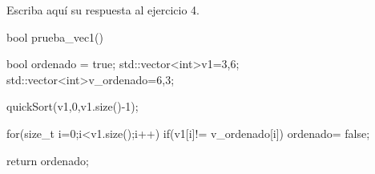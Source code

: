 Escriba aquí su respuesta al ejercicio 4.

\begin{lslisting}
bool prueba_vec1(){
    
bool ordenado = true; 
std::vector<int>v1={3,6};
std::vector<int>v_ordenado={6,3};
    
quickSort(v1,0,v1.size()-1);
    
for(size_t i=0;i<v1.size();i++){
    if(v1[i]!= v_ordenado[i]){
        ordenado= false;
    }
}
    
return ordenado;

}
\end{lslisting}